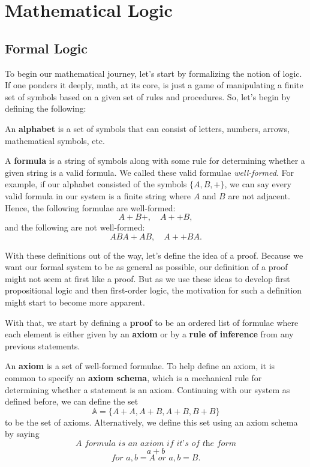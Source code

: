 \edef\mychapter{Mathematical Logic}
\edef\mychapterdate{\date}

\chapter{\mychapter}

\section{Formal Logic}
To begin our mathematical journey, let's start by formalizing the notion of logic.
If one ponders it deeply, math, at its core, is just a game of manipulating a finite set of symbols based on a given set of rules and procedures.
So, let's begin by defining the following:

An \textbf{alphabet} is a set of symbols that can consist of letters, numbers, arrows, mathematical symbols, etc.

A \textbf{formula} is a string of symbols along with some rule for determining whether a given string is a valid formula.
We called these valid formulae \textit{well-formed}.
For example, if our alphabet consisted of the symbols $\{A, B,+\}$, we can say every valid formula in our system is a finite string where $A$ and $B$ are not adjacent.
Hence, the following formulae are well-formed:
$$A+B+, \quad A++B,$$
and the following are not well-formed:
$$ABA+AB, \quad A++BA.$$

With these definitions out of the way, let's define the idea of a proof.
Because we want our formal system to be as general as possible, our definition of a proof might not seem at first like a proof.
But as we use these ideas to develop first propositional logic and then first-order logic, the motivation for such a definition might start to become more apparent.

With that, we start by defining a \textbf{proof} to be an ordered list of formulae where each element is either given by an \textbf{axiom} or by a \textbf{rule of inference} from any previous statements.

An \textbf{axiom} is a set of well-formed formulae.
To help define an axiom, it is common to specify an \textbf{axiom schema}, which is a mechanical rule for determining whether a statement is an axiom.
Continuing with our system as defined before, we can define the set
$$\mathbb{A}=\{A+A,A+B, A+B, B+B\}$$
to be the set of axioms.
Alternatively, we define this set using an axiom schema by saying
$$\textit{A formula is an axiom if it's of the form}$$
$$a+b$$
$$\textit{for $a,b=A$ or $a,b=B$}.$$

